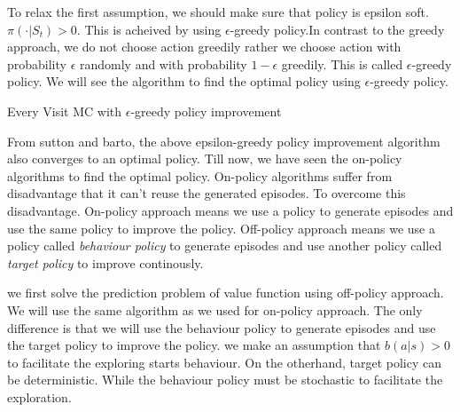 \documentclass[../main.tex]{subfiles}
\begin{document}
To relax the first assumption, we should make sure that policy is epsilon soft. $\pi(\cdot | S_t) > 0$. This is acheived by using $\epsilon$-greedy policy.In contrast to the greedy approach,  we do not choose action greedily rather we choose action with probability $\epsilon$ randomly and with probability $1-\epsilon$ greedily. This is called $\epsilon$-greedy policy. We will see the algorithm to find the optimal policy using $\epsilon$-greedy policy.

\begin{algorithm}[H]
\caption{Every Visit MC with $\epsilon$-greedy policy improvement}
\label{alg:ev-mc-egpi}
\end{algorithm}

From sutton and barto, the above epsilon-greedy policy improvement algorithm also converges to an optimal policy. Till now, we have seen the on-policy algorithms to find the optimal policy. On-policy algorithms suffer from disadvantage that it can't reuse the generated episodes. To overcome this disadvantage. On-policy approach means we use a policy to generate episodes and use the same policy to improve the policy. Off-policy approach means we use a policy called \emph{behaviour policy} to generate episodes and use another policy called \emph{target policy} to improve continously.

we first solve the prediction problem of value function using off-policy approach. We will use the same algorithm as we used for on-policy approach. The only difference is that we will use the behaviour policy to generate episodes and use the target policy to improve the policy. we make an assumption that $ b(a|s) >0$ to facilitate the exploring starts behaviour. On the otherhand, target policy can be deterministic. While the behaviour policy must be stochastic to facilitate the exploration.
\end{document}
